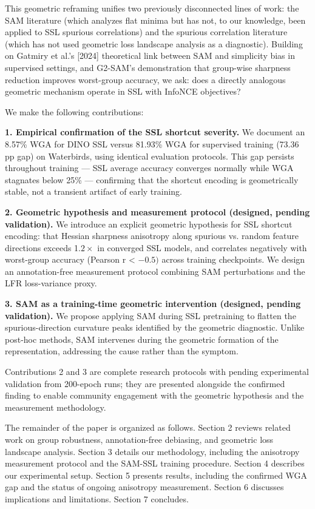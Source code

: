 This geometric reframing unifies two previously disconnected lines of work: the SAM literature (which analyzes flat minima but has not, to our knowledge, been applied to SSL spurious correlations) and the spurious correlation literature (which has not used geometric loss landscape analysis as a diagnostic). Building on Gatmiry et al.'s [2024] theoretical link between SAM and simplicity bias in supervised settings, and G2-SAM's \citep{park2025g2sam} demonstration that group-wise sharpness reduction improves worst-group accuracy, we ask: does a directly analogous geometric mechanism operate in SSL with InfoNCE objectives?

We make the following contributions:

\textbf{1. Empirical confirmation of the SSL shortcut severity.} We document an 8.57\% WGA for DINO SSL versus 81.93\% WGA for supervised training (73.36 pp gap) on Waterbirds, using identical evaluation protocols. This gap persists throughout training --- SSL average accuracy converges normally while WGA stagnates below 25\% --- confirming that the shortcut encoding is geometrically stable, not a transient artifact of early training.

\textbf{2. Geometric hypothesis and measurement protocol (designed, pending validation).} We introduce an explicit geometric hypothesis for SSL shortcut encoding: that Hessian sharpness anisotropy along spurious vs. random feature directions exceeds 1.$2\times$ in converged SSL models, and correlates negatively with worst-group accuracy (Pearson r < $-0.5)$ across training checkpoints. We design an annotation-free measurement protocol combining SAM perturbations and the LFR loss-variance proxy.

\textbf{3. SAM as a training-time geometric intervention (designed, pending validation).} We propose applying SAM during SSL pretraining to flatten the spurious-direction curvature peaks identified by the geometric diagnostic. Unlike post-hoc methods, SAM intervenes during the geometric formation of the representation, addressing the cause rather than the symptom.

Contributions 2 and 3 are complete research protocols with pending experimental validation from 200-epoch runs; they are presented alongside the confirmed finding to enable community engagement with the geometric hypothesis and the measurement methodology.

The remainder of the paper is organized as follows. Section 2 reviews related work on group robustness, annotation-free debiasing, and geometric loss landscape analysis. Section 3 details our methodology, including the anisotropy measurement protocol and the SAM-SSL training procedure. Section 4 describes our experimental setup. Section 5 presents results, including the confirmed WGA gap and the status of ongoing anisotropy measurement. Section 6 discusses implications and limitations. Section 7 concludes.

